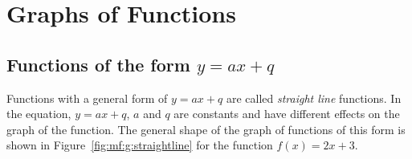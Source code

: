 \documentclass[10pt,a4paper,titlepage,twoside,openright]{report}
\begin{document}
\section{Graphs of Functions}
\label{mf:g10}

\subsection{Functions of the form $y=ax+q$}
Functions with a general form of $y=ax+q$ are called \textit{straight line} functions. In the equation, $y=ax+q$, $a$ and $q$ are constants and have different effects on the graph of the function. The general shape of the graph of functions of this form is shown in Figure~\ref{fig:mf:g:straightline} for the function $f(x)=2x+3$.
\end{document}
